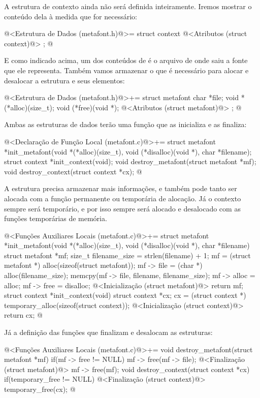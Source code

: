 A estrutura de contexto ainda não será definida inteiramente. Iremos
mostrar o conteúdo dela à medida que for necessário:

\iniciocodigo
@<Estrutura de Dados (metafont.h)@>=
struct context{
  @<Atributos (struct context)@>
};
@
\fimcodigo

E como indicado acima, um dos conteúdos de  é o arquivo de onde saiu a fonte que ele representa. Também
vamos armazenar o que é necessário para alocar e desalocar a estrutura
e seus elementos:

\iniciocodigo
@<Estrutura de Dados (metafont.h)@>+=
struct metafont{
  char *file;
  void *(*alloc)(size_t);
  void (*free)(void *);
  @<Atributos (struct metafont)@>
};
@
\fimcodigo

Ambas as estruturas de dados terão uma função que as inicializa e as
finaliza:

\iniciocodigo
@<Declaração de Função Local (metafont.c)@>+=
struct metafont *init_metafont(void *(*alloc)(size_t),
                              void (*disalloc)(void *),
                              char *filename);
struct context *init_context(void);
void destroy_metafont(struct metafont *mf);
void destroy_context(struct context *cx);
@
\fimcodigo

A estrutura  precisa armazenar mais informações,
e também pode tanto ser alocada com a função permanente ou temporária
de alocação. Já o contexto sempre será temporário, e por isso sempre
será alocado e desalocado com as funções temporárias de memória.

\iniciocodigo
@<Funções Auxiliares Locais (metafont.c)@>+=
struct metafont *init_metafont(void *(*alloc)(size_t),
                              void (*disalloc)(void *),
                              char *filename){
  struct metafont *mf;
  size_t filename_size = strlen(filename) + 1;
  mf = (struct metafont *) alloc(sizeof(struct metafont));
  mf -> file = (char *) alloc(filename_size);
  memcpy(mf -> file, filename, filename_size);
  mf -> alloc = alloc;
  mf -> free = disalloc;
  @<Inicialização (struct metafont)@>
  return mf;
}
struct context *init_context(void){
  struct context *cx;
  cx = (struct context *) temporary_alloc(sizeof(struct context));
  @<Inicialização (struct context)@>
  return cx;
}
@
\fimcodigo

Já a definição das funções que finalizam e desalocam as estruturas:

\iniciocodigo
@<Funções Auxiliares Locais (metafont.c)@>+=
void destroy_metafont(struct metafont *mf){
  if(mf -> free != NULL){
    mf -> free(mf -> file);
    @<Finalização (struct metafont)@>
    mf -> free(mf);
  }
}
void destroy_context(struct context *cx){
  if(temporary_free != NULL){
    @<Finalização (struct context)@>
    temporary_free(cx);
  }
}
@
\fimcodigo

